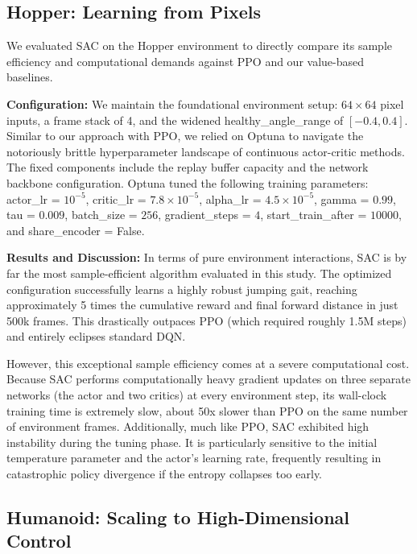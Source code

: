 \subsection{Hopper: Learning from Pixels}
\label{sec:sac_hopper_results}

We evaluated SAC on the Hopper environment to directly compare its sample efficiency and computational demands against PPO and our value-based baselines. 

\textbf{Configuration:}
We maintain the foundational environment setup: $64 \times 64$ pixel inputs, a frame stack of 4, and the widened healthy\_angle\_range of $[-0.4, 0.4]$. Similar to our approach with PPO, we relied on Optuna to navigate the notoriously brittle hyperparameter landscape of continuous actor-critic methods. 
The fixed components include the replay buffer capacity and the network backbone configuration. Optuna tuned the following training parameters: actor\_lr = $10^{-5}$, critic\_lr = $7.8 \times 10^{-5}$, alpha\_lr = $4.5 \times 10^{-5}$, gamma = $0.99$, tau = $0.009$, batch\_size = $256$, gradient\_steps = $4$, start\_train\_after = $10000$, and share\_encoder = False.

\textbf{Results and Discussion:}
In terms of pure environment interactions, SAC is by far the most sample-efficient algorithm evaluated in this study. The optimized configuration successfully learns a highly robust jumping gait, reaching approximately 5 times the cumulative reward and final forward distance in just 500k frames. This drastically outpaces PPO (which required roughly 1.5M steps) and entirely eclipses standard DQN.

However, this exceptional sample efficiency comes at a severe computational cost. Because SAC performs computationally heavy gradient updates on three separate networks (the actor and two critics) at every environment step, its wall-clock training time is extremely slow, about 50x slower than PPO on the same number of environment frames.
Additionally, much like PPO, SAC exhibited high instability during the tuning phase. It is particularly sensitive to the initial temperature parameter and the actor's learning rate, frequently resulting in catastrophic policy divergence if the entropy collapses too early.

\subsection{Humanoid: Scaling to High-Dimensional Control}
\label{sec:sac_humanoid_results}

